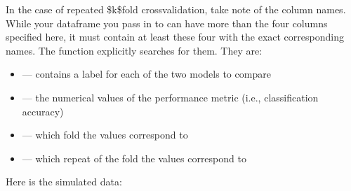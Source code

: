 \documentclass[letterpaper,10pt,english]{sphinxmanual}
\begin{document}
In the case of repeated \$k\$\sphinxhyphen{}fold cross\sphinxhyphen{}validation, take note of the column names. While your dataframe you pass in to  can have more than the four columns specified here, it must contain at least these four with the exact corresponding names. The function explicitly searches for them. They are:
\begin{itemize}
\item {} 
 — contains a label for each of the two models to compare

\item {} 
 — the numerical values of the performance metric (i.e., classification accuracy)

\item {} 
 — which fold the values correspond to

\item {} 
 — which repeat of the fold the values correspond to

\end{itemize}

Here is the simulated data:
\end{document}
